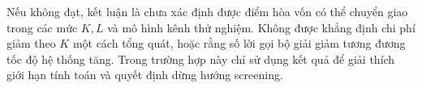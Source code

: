 \documentclass[11pt,onecolumn]{IEEEtran}
\begin{document}
Nếu không đạt, kết luận là chưa xác định được điểm hòa vốn có thể chuyển giao trong các mức $K,L$ và mô hình kênh thử nghiệm. Không được khẳng định chi phí giảm theo $K$ một cách tổng quát, hoặc rằng số lời gọi bộ giải giảm tương đương tốc độ hệ thống tăng. Trong trường hợp này chỉ sử dụng kết quả để giải thích giới hạn tính toán và quyết định dừng hướng screening.
\end{document}
